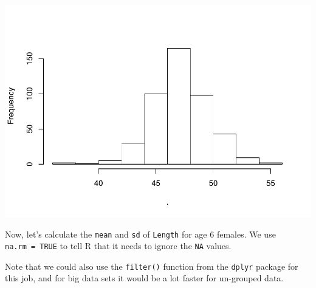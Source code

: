 \documentclass[
]{book}
\newenvironment{Shaded}{\begin{snugshade}}{\end{snugshade}}
\newcommand{\CommentTok}[1]{\textcolor[rgb]{0.56,0.35,0.01}{\textit{#1}}}
\newcommand{\DataTypeTok}[1]{\textcolor[rgb]{0.13,0.29,0.53}{#1}}
\newcommand{\DecValTok}[1]{\textcolor[rgb]{0.00,0.00,0.81}{#1}}
\newcommand{\KeywordTok}[1]{\textcolor[rgb]{0.13,0.29,0.53}{\textbf{#1}}}
\newcommand{\NormalTok}[1]{#1}
\newcommand{\OperatorTok}[1]{\textcolor[rgb]{0.81,0.36,0.00}{\textbf{#1}}}
\newcommand{\OtherTok}[1]{\textcolor[rgb]{0.56,0.35,0.01}{#1}}
\newcommand{\StringTok}[1]{\textcolor[rgb]{0.31,0.60,0.02}{#1}}
\begin{document}
\includegraphics{worstr_files/figure-latex/unnamed-chunk-81-1.pdf}

Now, let's calculate the \texttt{mean} and \texttt{sd} of \texttt{Length} for age 6 females. We use \texttt{na.rm\ =\ TRUE} to tell R that it needs to ignore the \texttt{NA} values.

\begin{Shaded}
\end{Shaded}

Note that we could also use the \texttt{filter()} function from the \texttt{dplyr} package for this job, and for big data sets it would be a lot faster for un-grouped data.
\end{document}
